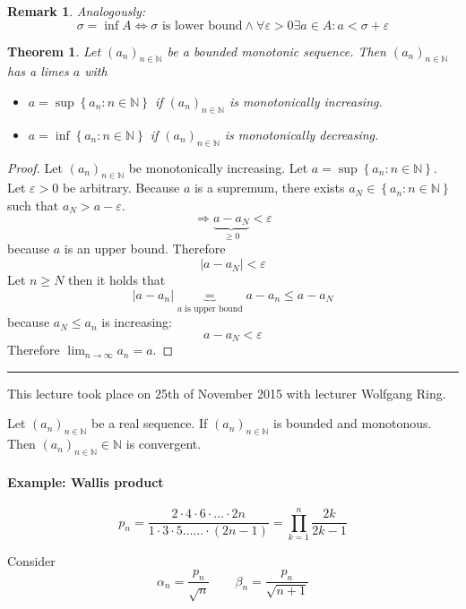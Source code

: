 \documentclass[a4paper,landscape,twocolumn]{article}
\newtheorem{theorem}{Theorem}
\newtheorem{rem}{Remark}
\newcommand\set[1]{\left\{#1\right\}}
\newcommand\abs[1]{\left|#1\right|}
\newcommand\seq[1]{{\left(#1\right)}_{n \in \mathbb N}}
\newcommand\meta[3]{\hrule{} This #1 took place on #2 with lecturer #3.\par}
\begin{document}
\begin{rem}
  Analogously:
  \[ \sigma = \inf{A} \Leftrightarrow \sigma \text{ is lower bound} \land \forall \varepsilon > 0 \exists a \in A: a < \sigma + \varepsilon \]
\end{rem}

\begin{theorem}
  \label{monotonic-in-R}
  Let $(a_n)_{n \in \mathbb N}$ be a bounded monotonic sequence.
  Then $\seq{a_n}$ has a limes $a$ with
  \begin{itemize}
    \item $a = \sup\set{a_n: n \in \mathbb N}$ if $\seq{a_n}$ is monotonically increasing.
    \item $a = \inf\set{a_n: n \in \mathbb N}$ if $\seq{a_n}$ is monotonically decreasing.
  \end{itemize}
\end{theorem}

\begin{proof}
  Let $\seq{a_n}$ be monotonically increasing. Let $a = \sup\set{a_n: n \in \mathbb N}$.
  Let $\varepsilon > 0$ be arbitrary. Because $a$ is a supremum, there exists $a_N \in \set{a_n: n \in \mathbb N}$
  such that $a_N > a - \varepsilon$.
  \[ \Rightarrow \underbrace{a - a_N}_{\geq 0} < \varepsilon \]
  because $a$ is an upper bound. Therefore
  \[ \abs{a - a_N} < \varepsilon \]
  Let $n \geq N$ then it holds that
  \[ \abs{a - a_n} \underbrace{=}_{a \text{ is upper bound}} a - a_n \leq a - a_N \]
  because $a_N \leq a_n$ is increasing:
  \[ a - a_N < \varepsilon \]
  Therefore $\lim_{n \rightarrow \infty} a_n = a$.
\end{proof}

\meta{lecture}{25th of November 2015}{Wolfgang Ring}

Let $\seq{a_n}$ be a real sequence.
If $\seq{a_n}$ is bounded and monotonous.
Then $\seq{a_n} \in \mathbb N$ is convergent.

\paragraph{Example: Wallis product}


\[
    p_n
    = \frac{2 \cdot 4 \cdot 6 \cdot \ldots \cdot 2n}{1 \cdot 3 \cdot 5 \dots \ldots \cdot (2n-1)}
    = \prod_{k=1}^n \frac{2k}{2k-1}
\]

Consider
\[ \alpha_n = \frac{p_n}{\sqrt{n}} \qquad \beta_n = \frac{p_n}{\sqrt{n+1}} \]
\end{document}
